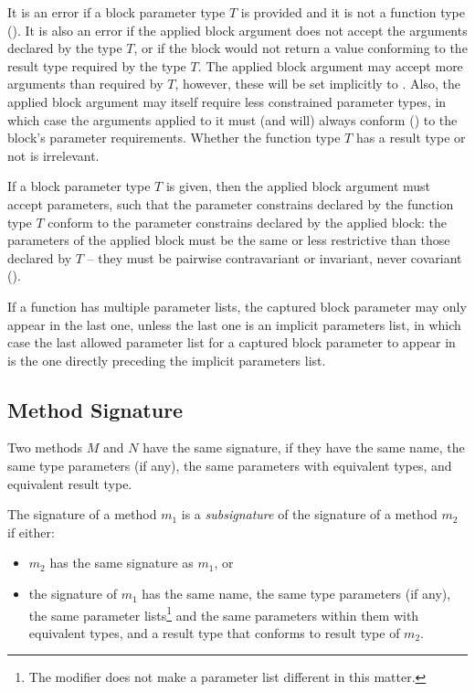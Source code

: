 It is an error if a block parameter type $T$ is provided and it is not a function type (). It is also an error if the applied block argument does not accept the arguments declared by the type $T$, or if the block would not return a value conforming to the result type required by the type $T$. The applied block argument may accept more arguments than required by $T$, however, these will be set implicitly to . Also, the applied block argument may itself require less constrained parameter types, in which case the arguments applied to it must (and will) always conform () to the block's parameter requirements. Whether the function type $T$ has a result type or not is irrelevant. 

If a block parameter type $T$ is given, then the applied block argument must accept parameters, such that the parameter constrains declared by the function type $T$ conform to the parameter constrains declared by the applied block: the parameters of the applied block must be the same or less restrictive than those declared by $T$ -- they must be pairwise contravariant or invariant, never covariant (). 

If a function has multiple parameter lists, the captured block parameter may only appear in the last one, unless the last one is an implicit parameters list, in which case the last allowed parameter list for a captured block parameter to appear in is the one directly preceding the implicit parameters list. 





\subsection{Method Signature}
\label{sec:method-signature}

Two methods $M$ and $N$ have the same signature, if they have the same name, the same type parameters (if any), the same parameters with equivalent types, and equivalent result type. 

The signature of a method $m_1$ is a {\em subsignature} of the signature of a method $m_2$ if either:
\begin{itemize}
\item $m_2$ has the same signature as $m_1$, or
\item the signature of $m_1$ has the same name, the same type parameters (if any), the same parameter lists\footnote{The  modifier does not make a parameter list different in this matter.} and the same parameters within them with equivalent types, and a result type that conforms to result type of $m_2$. 
\end{itemize}

